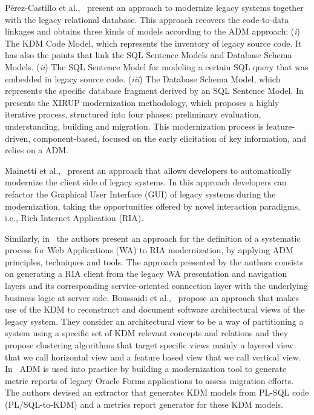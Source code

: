  P\'{e}rez-Castillo et al.,~\cite{5328801, delCastillo:2009:PRP:1529282.1529753, ICEISPerez:CastilloGCP12} present an approach to modernize legacy systems together with the legacy relational database. This approach recovers the code-to-data linkages and obtains three kinds of models according to the ADM approach: (\textit{i}) The KDM Code Model, which represents the inventory of legacy source code. It has also the points that link the SQL Sentence Models and Database Schema Models. (\textit{ii}) The SQL Sentence Model for modeling a certain SQL query that was embedded in legacy source code. (\textit{iii}) The Database Schema Model, which represents the specific database fragment derived by an SQL Sentence Model. In~\cite{FuentesFernandez2012247} presents the XIRUP modernization methodology, which proposes a highly iterative process, structured into four phases: preliminary evaluation, understanding, building and migration. This modernization process is feature-driven, component-based, focused on the early elicitation of key information, and relies on a ADM.

Mainetti et al.,~\cite{Mainetti:2012:MMT:2364120.2364182} present an approach that allows developers to automatically modernize the client side of legacy systems. In this approach developers can refactor the Graphical User Interface (GUI) of legacy systems during the modernization, taking the opportunities offered by novel interaction paradigms, i.e., Rich Internet Application (RIA). 

Similarly, in~\cite{Rodriguez-Echeverria:2011:MLW:2186508.2186536} the authors present an approach for the definition of a systematic process for Web Applications (WA) to RIA modernization, by applying ADM principles, techniques and tools. The approach presented by the authors consists on generating a RIA client from the legacy WA presentation and navigation layers and its corresponding service-oriented connection layer with the underlying business logic at server side. Boussaidi et al.,~\cite{6385130} propose an approach that makes use of the KDM to reconstruct and document software architectural views of the legacy system. They consider an architectural view to be a way of partitioning a system using a specific set of KDM relevant concepts and relations and they propose clustering algorithms that target specific views mainly a layered view that we call horizontal view and a feature based view that we call vertical view. In~\cite{5440163} ADM is used into practice by building a modernization tool to generate metric reports of legacy Oracle Forms applications to assess migration efforts. The authors devised an extractor that generates KDM models from PL-SQL code (PL/SQL-to-KDM) and a metrics report generator for these KDM models. 

